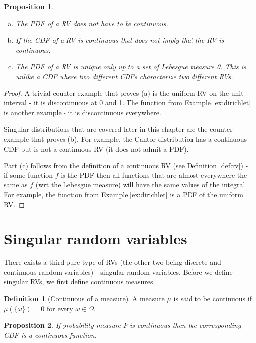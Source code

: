 \documentclass{book}
\theoremstyle{plain}%
\newtheorem{proposition}{Proposition}[section]
\theoremstyle{definition}
\newtheorem{definition}{Definition}[section]
\begin{document}
\begin{proposition}
$ $
\begin{enumerate}[(a)]
\item The PDF of a RV does not have to be continuous.
\item If the CDF of a RV is continuous that does not imply that the RV is continuous.
\item The PDF of a RV is unique only up to a set of Lebesgue measure 0. This is unlike a CDF where two different CDFs characterize two different RVs.
\end{enumerate}\label{prop:pdf}
\end{proposition}

\begin{proof}
A trivial counter-example that proves (a) is the uniform RV on the unit interval - it is discontinuous at 0 and 1. The function from Example \ref{ex:dirichlet} is another example - it is discontinuous everywhere.

Singular distributions that are covered later in this chapter are the counter-example that proves (b). For example, the Cantor distribution has a continuous CDF but is not a continuous RV (it does not admit a PDF).

Part (c) follows from the definition of a continuous RV (see Definition \ref{def:rv}) - if some function $f$ is the PDF then all functions that are almost everywhere the same as $f$ (wrt the Lebesgue measure) will have the same values of the integral. For example, the function from Example \ref{ex:dirichlet} is a PDF of the uniform RV.
\end{proof}

\section{Singular random variables}

There exists a third pure type of RVs (the other two being discrete and continuous random variables) - singular random variables. Before we define singular RVs, we first define continuous measures.

\begin{definition}[Continuous of a measure]
A measure $\mu$ is said to be continuous if $\mu(\{\omega\}) = 0$ for every $\omega \in \Omega$.
\end{definition}

\begin{proposition}
If probability measure $P$ is continuous then the corresponding CDF is a continuous function.
\end{proposition}
\end{document}
